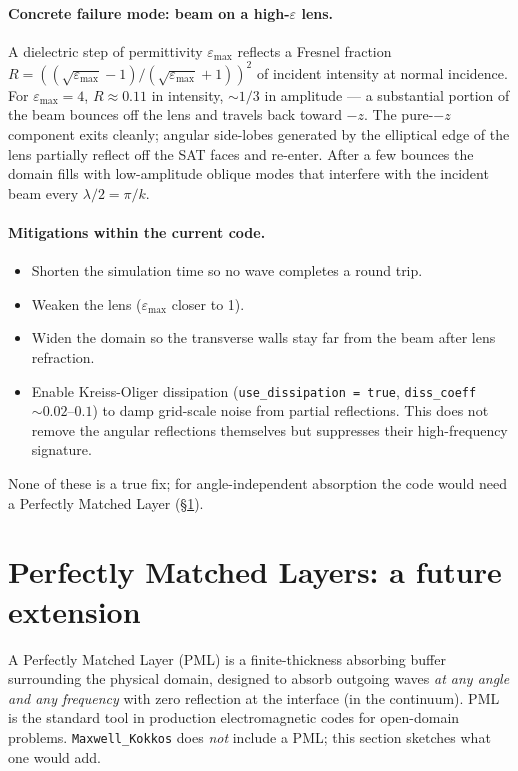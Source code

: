 \documentclass[11pt]{article}
\newcommand{\eps}{\varepsilon}
\begin{document}
\paragraph{Concrete failure mode: beam on a high-$\eps$ lens.}
A dielectric step of permittivity $\eps_{\max}$ reflects a Fresnel
fraction $R = ((\sqrt{\eps_{\max}} - 1)/(\sqrt{\eps_{\max}} + 1))^2$
of incident intensity at normal incidence.  For $\eps_{\max} = 4$,
$R \approx 0.11$ in intensity, $\sim 1/3$ in amplitude --- a
substantial portion of the beam bounces off the lens and travels
back toward $-z$.  The pure-$-z$ component exits cleanly; angular
side-lobes generated by the elliptical edge of the lens partially
reflect off the SAT faces and re-enter.  After a few bounces the
domain fills with low-amplitude oblique modes that interfere with
the incident beam every $\lambda/2 = \pi/k$.

\paragraph{Mitigations within the current code.}
\begin{itemize}[itemsep=2pt,topsep=2pt]
  \item Shorten the simulation time so no wave completes a round
        trip.
  \item Weaken the lens ($\eps_{\max}$ closer to 1).
  \item Widen the domain so the transverse walls stay far from
        the beam after lens refraction.
  \item Enable Kreiss-Oliger dissipation
        (\texttt{use\_dissipation = true},
        \texttt{diss\_coeff} $\sim 0.02$--$0.1$) to damp grid-scale
        noise from partial reflections.  This does not remove the
        angular reflections themselves but suppresses their
        high-frequency signature.
\end{itemize}
None of these is a true fix; for angle-independent absorption the
code would need a Perfectly Matched Layer (\S\ref{sec:pml}).

\section{Perfectly Matched Layers: a future extension}
\label{sec:pml}

A Perfectly Matched Layer (PML) is a finite-thickness absorbing
buffer surrounding the physical domain, designed to absorb
outgoing waves \emph{at any angle and any frequency} with zero
reflection at the interface (in the continuum).  PML is the
standard tool in production electromagnetic codes for open-domain
problems.  \texttt{Maxwell\_Kokkos} does \emph{not} include a PML;
this section sketches what one would add.
\end{document}
